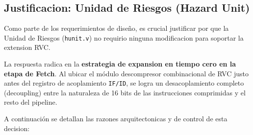 \documentclass[12pt, a4paper]{article}
\begin{document}
\subsection{Justificacion: Unidad de Riesgos (Hazard Unit)}
Como parte de los requerimientos de diseño, es crucial justificar por que la Unidad de Riesgos (\texttt{hunit.v}) no requirio ninguna modificacion para soportar la extension RVC. 

La respuesta radica en la \textbf{estrategia de expansion en tiempo cero en la etapa de Fetch}. Al ubicar el módulo descompresor combinacional de RVC justo antes del registro de acoplamiento \texttt{IF/ID}, se logra un desacoplamiento completo (decoupling) entre la naturaleza de 16 bits de las instrucciones comprimidas y el resto del pipeline. 

A continuación se detallan las razones arquitectonicas y de control de esta decision:
\end{document}
